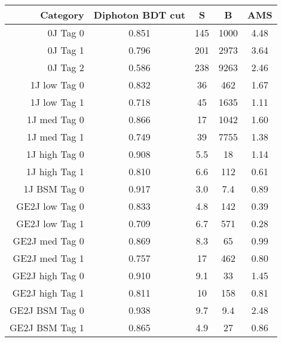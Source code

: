 \begin{tabular}{ r | c | c | c | c } 
\hline 
Category         & Diphoton BDT cut & S      & B          & AMS \\
\hline 
0J Tag 0         & 0.851            & 145    & 1000       & 4.48                    \\
0J Tag 1         & 0.796            & 201    & 2973       & 3.64                    \\
0J Tag 2         & 0.586            & 238    & 9263       & 2.46                    \\
\hline           
1J low  Tag 0    & 0.832            & 36     & 462        & 1.67                    \\
1J low  Tag 1    & 0.718            & 45     & 1635       & 1.11                    \\
1J med  Tag 0    & 0.866            & 17     & 1042       & 1.60                    \\
1J med  Tag 1    & 0.749            & 39     & 7755       & 1.38                    \\
1J high Tag 0    & 0.908            & 5.5    & 18         & 1.14                    \\
1J high Tag 1    & 0.810            & 6.6    & 112        & 0.61                    \\
1J BSM  Tag 0    & 0.917            & 3.0    & 7.4        & 0.89                    \\
\hline           
GE2J low  Tag 0  & 0.833            & 4.8    & 142        & 0.39                    \\
GE2J low  Tag 1  & 0.709            & 6.7    & 571        & 0.28                    \\
GE2J med  Tag 0  & 0.869            & 8.3    & 65         & 0.99                    \\
GE2J med  Tag 1  & 0.757            & 17     & 462        & 0.80                    \\
GE2J high Tag 0  & 0.910            & 9.1    & 33         & 1.45                    \\
GE2J high Tag 1  & 0.811            & 10     & 158        & 0.81                    \\
GE2J BSM  Tag 0  & 0.938            & 9.7    & 9.4        & 2.48                    \\
GE2J BSM  Tag 1  & 0.865            & 4.9    & 27         & 0.86                    \\
\hline 
\end{tabular}
